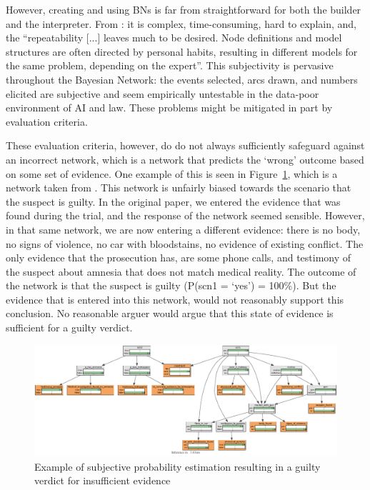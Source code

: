 \documentclass[12pt]{article}
\begin{document}
However, creating and using BNs is far from straightforward for both the builder and the interpreter. From \citet{deKoeijer2020}: it is complex, time-consuming, hard to explain, and, the ``repeatability [...] leaves much to be desired. Node definitions and model structures are often directed by personal habits, resulting in different models for the same problem, depending on the expert''. This subjectivity is pervasive throughout the Bayesian Network: the events selected, arcs drawn, and numbers elicited are subjective and seem empirically untestable in the data-poor environment of AI and law. These problems might be mitigated in part by evaluation criteria. 

These evaluation criteria, however, do do not always sufficiently safeguard against an incorrect network, which is a network that predicts the `wrong' outcome based on some set of evidence. One example of this is seen in Figure~\ref{love}, which is a network taken from \citet{vanLeeuwen2019}. This network is unfairly biased towards the scenario that the suspect is guilty. In the original paper, we entered the evidence that was found during the trial, and the response of the network seemed sensible. However, in that same network, we are now entering a different evidence: there is no body, no signs of violence, no car with bloodstains, no evidence of existing conflict. The only evidence that the prosecution has, are some phone calls, and  testimony of the suspect about amnesia that does not match medical reality. The outcome of the network is that the suspect is guilty (P(scn1 = `yes') = 100\%). But the evidence that is entered into this network, would not reasonably support this conclusion. No reasonable arguer would argue that this state of evidence is sufficient for a guilty verdict.

\begin{figure}[htbp]
\includegraphics[width=\linewidth]{images/oldnetwork.pdf}
\caption{Example of subjective probability estimation resulting in a guilty verdict for insufficient evidence}
\label{love}
\end{figure}%
\end{document}

